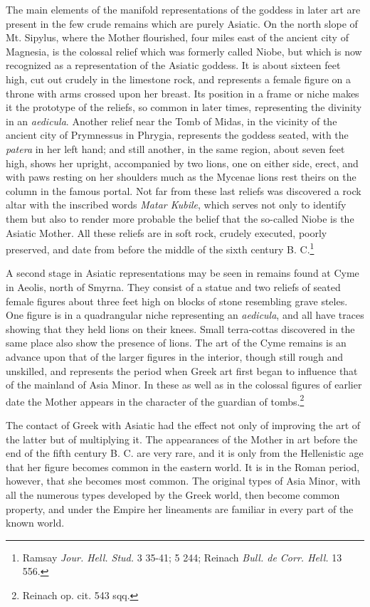 \documentclass[a4paper, 11pt, oneside, polutonikogreek, english]{article}
\begin{document}
The main elements of the manifold representations of the goddess in later art are present in the few crude remains which are purely Asiatic. On the north slope of Mt. Sipylus, where the Mother flourished, four miles east of the ancient city of Magnesia, is the colossal relief which was formerly called Niobe, but which is now recognized as a representation of the Asiatic goddess. It is about sixteen feet high, cut out crudely in the limestone rock, and represents a female figure on a throne with arms crossed upon her breast. Its position in a frame or niche makes it the prototype of the reliefs, so common in later times, representing the divinity in an \emph{aedicula}. Another relief near the Tomb of Midas, in the vicinity of the ancient city of Prymnessus in Phrygia, represents the goddess seated, with the \emph{patera} in her left hand; and still another, in the same region, about seven feet high, shows her upright, accompanied by two lions, one on either side, erect, and with paws resting on her shoulders much as the Mycenae lions rest theirs on the column in the famous portal. Not far from these last reliefs was discovered a rock altar with the inscribed words \emph{Matar Kubile}, which serves not only to identify them but also to render more probable the belief that the so-called Niobe is the Asiatic Mother. All these reliefs are in soft rock, crudely executed, poorly preserved, and date from before the middle of the sixth century B. C.\footnote{Ramsay \emph{Jour. Hell. Stud.} 3 35-41; 5 244; Reinach \emph{Bull. de Corr. Hell.} 13 556.}

A second stage in Asiatic representations may be seen in remains found at Cyme in Aeolis, north of Smyrna. They consist of a statue and two reliefs of seated female figures about three feet high on blocks of stone resembling grave steles. One figure is in a quadrangular niche representing an \emph{aedicula}, and all have traces showing that they held lions on their knees. Small terra-cottas discovered in the same place also show the presence of lions. The art of the Cyme remains is an advance upon that of the larger figures in the interior, though still rough and unskilled, and represents the period when Greek art first began to influence that of the mainland of Asia Minor. In these as well as in the colossal figures of earlier date the Mother appears in the character of the guardian of tombs.\footnote{Reinach op. cit. 543 sqq.}

The contact of Greek with Asiatic had the effect not only of improving the art of the latter but of multiplying it. The appearances of the Mother in art before the end of the fifth century B. C. are very rare, and it is only from the Hellenistic age that her figure becomes common in the eastern world. It is in the Roman period, however, that she becomes most common. The original types of Asia Minor, with all the numerous types developed by the Greek world, then become common property, and under the Empire her lineaments are familiar in every part of the known world.
\end{document}
